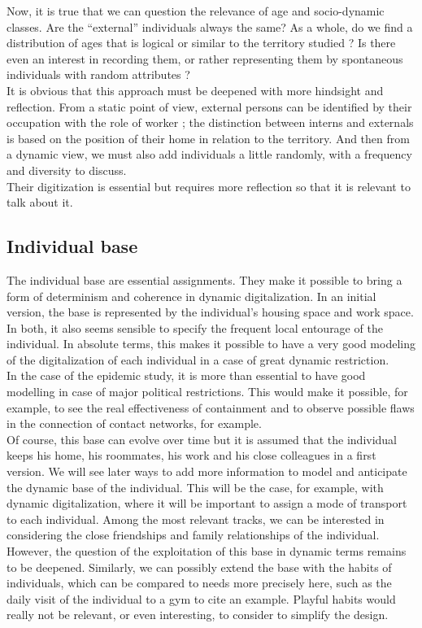 Now, it is true that we can question the relevance of age and socio-dynamic classes. Are the ``external'' individuals always the same? As a whole, do we find a distribution of ages that is logical or similar to the territory studied ? Is there even an interest in recording them, or rather representing them by spontaneous individuals with random attributes ?\\

It is obvious that this approach must be deepened with more hindsight and reflection. From a static point of view, external persons can be identified by their occupation with the role of worker ; the distinction between interns and externals is based on the position of their home in relation to the territory. And then from a dynamic view, we must also add individuals a little randomly, with a frequency and diversity to discuss.\\

Their digitization is essential but requires more reflection so that it is relevant to talk about it.\\

\subsection{Individual base}

The individual base are essential assignments. They make it possible to bring a form of determinism and coherence in dynamic digitalization. In an initial version, the base is represented by the individual's housing space and work space. In both, it also seems sensible to specify the frequent local entourage of the individual. In absolute terms, this makes it possible to have a very good modeling of the digitalization of each individual in a case of great dynamic restriction.\\

In the case of the epidemic study, it is more than essential to have good modelling in case of major political restrictions. This would make it possible, for example, to see the real effectiveness of containment and to observe possible flaws in the connection of contact networks, for example.\\

Of course, this base can evolve over time but it is assumed that the individual keeps his home, his roommates, his work and his close colleagues in a first version. We will see later ways to add more information to model and anticipate the dynamic base of the individual. This will be the case, for example, with dynamic digitalization, where it will be important to assign a mode of transport to each individual. Among the most relevant tracks, we can be interested in considering the close friendships and family relationships of the individual. However, the question of the exploitation of this base in dynamic terms remains to be deepened. Similarly, we can possibly extend the base with the habits of individuals, which can be compared to needs more precisely here, such as the daily visit of the individual to a gym to cite an example. Playful habits would really not be relevant, or even interesting, to consider to simplify the design.\\

